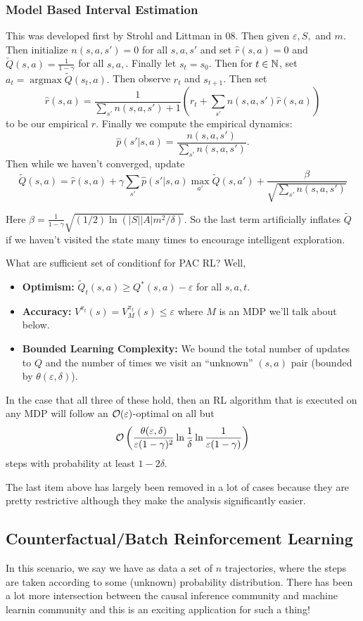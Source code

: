 \documentclass[12pt]{article}
\DeclareMathOperator*{\argmax}{argmax}
\begin{document}
\subsubsection{Model Based Interval Estimation}
This was developed first by Strohl and Littman in 08. Then given $\varepsilon, S,$ and $m$. Then initialize $n(s,a,s')=0$ for all $s,a,s'$ and set $\hat r(s,a)=0$ and $\tilde Q(s,a)=\frac{1}{1-\gamma}$ for all $s,a,$.
Finally let $s_t=s_0$. Then for $t\in\mathbb{N}$, set $a_t=\argmax \tilde Q(s_t,a).$ Then observe $r_t$ and $s_{t+1}$. Then set 
\[\hat r(s,a)=\frac{1}{\sum_{s'}n(s,a,s')+1}\left(r_t+\sum_{s'}n(s,a,s')\hat r(s,a)\right)\]
to be our empirical $r$. Finally we compute the empirical dynamics:
\[\hat p(s'|s,a)=\frac{n(s,a,s')}{\sum_{s'}n(s,a,s')}.\]
Then while we haven't converged, update 
\[\tilde Q(s,a)=\hat r(s,a)+\gamma\sum_{s'}\hat p(s'|s,a)\max_{a'}\tilde Q(s,a')+\frac{\beta}{\sqrt{\sum_{s'}n(s,a,s')}}\]

Here $\beta=\frac{1}{1-\gamma}\sqrt{(1/2)\ln(|S||A|m^2/\delta)}$. So the last term artificially inflates $\tilde Q$ if we haven't visited the state many times to encourage intelligent exploration.

What are sufficient set of conditionf for PAC RL? Well,
\begin{itemize}
	\item \textbf{Optimism:} $\tilde Q_t(s,a)\ge Q^\ast(s,a)-\varepsilon$ for all $s,a,t$.
	\item \textbf{Accuracy:} $V^{\pi_t}(s)=V_M^{\pi_t}(s)\le \varepsilon$ where $M$ is an MDP we'll talk about below.
	\item \textbf{Bounded Learning Complexity:} We bound the total number of updates to $Q$ and the number of times we visit an ``unknown'' $(s,a)$ pair (bounded by $\theta(\varepsilon,\delta)$).
\end{itemize}
In the case that all three of these hold, then an RL algorithm that is executed on any MDP will follow an $\mathcal{O}(\varepsilon)$-optimal on all but 
\[\mathcal{O}\left(\frac{\theta(\varepsilon,\delta)}{\varepsilon(1-\gamma)^2}\ln\frac{1}{\delta}\ln\frac{1}{\varepsilon(1-\gamma)}\right)\]
steps with probability at least $1-2\delta$.

The last item above has largely been removed in a lot of cases because they are pretty restrictive although they make the analysis significantly easier.

\subsection{Counterfactual/Batch Reinforcement Learning}
In this scenario, we say we have as data a set of $n$ trajectories, where the steps are taken according to some (unknown) probability distribution. 
There has been a lot more intersection between the causal inference community and machine learnin community and this is an exciting application for such a thing!
\end{document}
